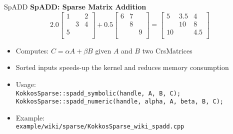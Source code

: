 \begin{frame}[fragile]{SpADD}
  \textbf{SpADD: Sparse Matrix Addition}
    \begin{equation*}
      2.0\begin{bmatrix}
        1 &   & 2 \\
          & 3 & 4 \\
        5 &   &   \\
      \end{bmatrix}
      +0.5\begin{bmatrix}
      6 &  7 &  \\
        &  8 &  \\
        &    & 9\\
      \end{bmatrix}
      =\begin{bmatrix}
       5 & 3.5 &   4\\
         &  10 &   8\\
      10 &     & 4.5\\
      \end{bmatrix}
    \end{equation*}
  
  \begin{itemize}
  \item Computes: $C=\alpha A + \beta B$ given $A$ and $B$ two CrsMatrices
  \item Sorted inputs speeds-up the kernel and reduces memory consumption
  \item Usage:\\
    \hspace{1em} \texttt{KokkosSparse::spadd\_symbolic(handle, A, B, C);}\\
    \hspace{1em} \texttt{KokkosSparse::spadd\_numeric(handle, alpha, A, beta, B, C);}
  \item Example:\\
    \hspace{1em} \texttt{example/wiki/sparse/KokkosSparse\_wiki\_spadd.cpp}
  \end{itemize}
\end{frame}


